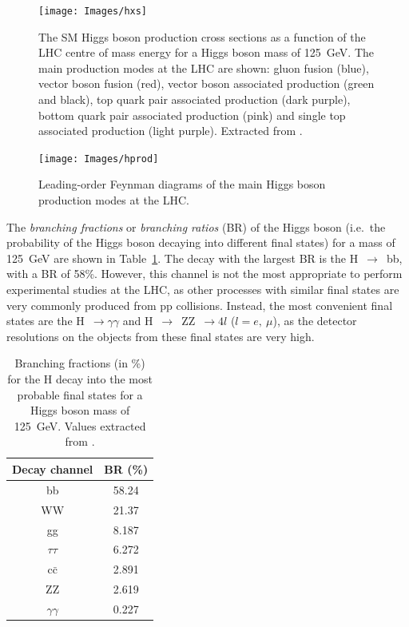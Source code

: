 \documentclass[../main.tex]{subfiles}
\begin{document}
\begin{figure}[h!]
\begin{center}
\texttt{[image: Images/hxs]}
\end{center}
\caption[SM Higgs boson production cross sections]{The SM Higgs boson production cross sections as a function of the LHC centre of mass energy for a Higgs boson mass of 125~GeV. The main production modes at the LHC are shown: gluon fusion (blue), vector boson fusion (red), vector boson associated production (green and black), top quark pair associated production (dark purple), bottom quark pair associated production (pink) and single top associated production (light purple). Extracted from \cite{intro:theo:yellow_higgs}.}
\label{theo:fig:h_production_xs}
\end{figure}

\begin{figure}[h!]
\begin{center}
\texttt{[image: Images/hprod]}
\end{center}
\caption[LO Feynman diagrams of the main Higgs boson production modes]{Leading-order Feynman diagrams of the main Higgs boson production modes at the LHC.}
\label{theo:fig:h_feynman}
\end{figure}

The \textit{branching fractions} or \textit{branching ratios} (BR) of the Higgs boson (i.e.~the probability of the Higgs boson decaying into different final states) for a mass of 125~GeV are shown in Table~\ref{theo:tab:h_br}. The decay with the largest BR is the H~$\to$~bb, with a BR of 58\%. However, this channel is not the most appropriate to perform experimental studies at the LHC, as other processes with similar final states are very commonly produced from pp collisions. Instead, the most convenient final states are the H~$\to\gamma\gamma$ and H~$\to$~ZZ~$\to4l$ ($l=e,~\mu$), as the detector resolutions on the objects from  these final states are very high.

\begin{table}[h!]
\begin{center}
\begin{tabular}{c | c}
Decay channel & BR (\%) \\\hline
bb & 58.24 \\
WW & 21.37 \\
gg & 8.187 \\
$\tau\tau$ & 6.272 \\
c$\bar{\text{c}}$ & 2.891 \\
ZZ & 2.619 \\
$\gamma\gamma$ & 0.227
\end{tabular}
\caption[Higgs decay branching fractions]{Branching fractions (in \%) for the H decay into the most probable final states for a Higgs boson mass of 125~GeV. Values extracted from \cite{intro:theo:yellow_higgs}.}
\label{theo:tab:h_br}
\end{center}
\end{table}
\end{document}
